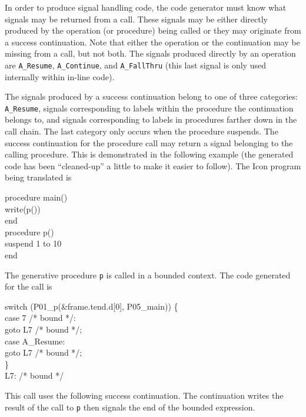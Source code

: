 In order to produce signal handling code, the code generator must know
what signals may be returned from a call. These signals may be either
directly produced by the operation (or procedure) being called or they
may originate from a success continuation. Note that either the
operation or the continuation may be missing from a call, but not
both. The signals produced directly by an operation are
\texttt{A\_Resume}, \texttt{A\_Continue}, and \texttt{A\_FallThru}
(this last signal is only used internally within in-line code).

The signals produced by a success continuation belong to one of three
categories: \texttt{A\_Resume}, signals corresponding to labels within the
procedure the continuation belongs to, and signals corresponding to
labels in procedures farther down in the call chain. The last category
only occurs when the procedure suspends. The success continuation for
the procedure call may return a signal belonging to the calling
procedure. This is demonstrated in the following example (the
generated code has been ``cleaned-up'' a little to make it easier to
follow).  The Icon program being translated is

\goodbreak
\begin{iconcode}
procedure main()\\
\>write(p())\\
end\\
procedure p()\\
\>suspend 1 to 10\\
end\\
\end{iconcode}


The generative procedure \texttt{p} is called in a bounded context. The code
generated for the call is

\goodbreak
\begin{iconcode}
switch (P01\_p(\&frame.tend.d[0], P05\_main)) \{\\
\>case 7 /* bound */:\\
\>\>goto L7 /* bound */;\\
\>case A\_Resume:\\
\>\>goto L7 /* bound */;\\
\>\}\\
L7: /* bound */\\
\end{iconcode}

\noindent
This call uses the following success continuation. The continuation
writes the result of the call to \texttt{p} then signals the end of the bounded
expression.

